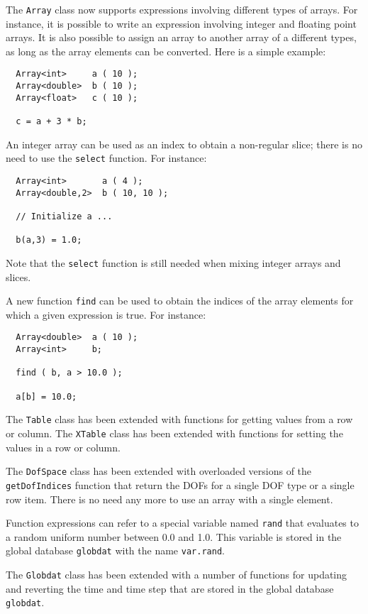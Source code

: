 \documentclass[a4paper]{article}
\newcommand{\Code}[1]{\texttt{#1}}
\begin{document}
The \Code{Array} class now supports expressions involving different types
of arrays. For instance, it is possible to write an expression involving
integer and floating point arrays. It is also possible to assign an array
to another array of a different types, as long as the array elements can
be converted. Here is a simple example:
\begin{lstlisting}
  Array<int>     a ( 10 );
  Array<double>  b ( 10 );
  Array<float>   c ( 10 );

  c = a + 3 * b;
\end{lstlisting}
An integer array can be used as an index to obtain a non-regular slice;
there is no need to use the \Code{select} function. For instance:
\begin{lstlisting}
  Array<int>       a ( 4 );
  Array<double,2>  b ( 10, 10 );

  // Initialize a ...

  b(a,3) = 1.0;
\end{lstlisting}
Note that the \Code{select} function is still needed when mixing integer
arrays and slices.

A new function \Code{find} can be used to obtain the indices of the array
elements for which a given expression is true. For instance:
\begin{lstlisting}
  Array<double>  a ( 10 );
  Array<int>     b;

  find ( b, a > 10.0 );

  a[b] = 10.0;
\end{lstlisting}

The \Code{Table} class has been extended with functions for getting
values from a row or column. The \Code{XTable} class has been extended
with functions for setting the values in a row or column.

The \Code{DofSpace} class has been extended with overloaded versions of
the \Code{getDofIndices} function that return the DOFs for a single DOF
type or a single row item. There is no need any more to use an array with
a single element.

Function expressions can refer to a special variable named \Code{rand}
that evaluates to a random uniform number between 0.0 and 1.0. This
variable is stored in the global database \Code{globdat} with the name
\Code{var.rand}.

The \Code{Globdat} class has been extended with a number of functions for
updating and reverting the time and time step that are stored in the
global database \Code{globdat}.
\end{document}
